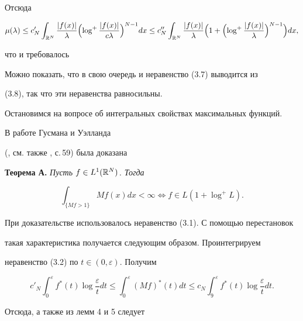 Отсюда 


$$ 


\mu(\lambda)\le c'_N \int_{\Bbb R^N}\frac{|f(x)|}{\lambda} 


\Bigl(\log^+\frac{|f(x)|}{c\lambda}\Bigr)^{N-1}dx \le


c''_N \int_{\Bbb R^N}\frac{|f(x)|}{\lambda}


\Bigl(1+\Bigl(\log^+\frac{|f(x)|}{\lambda}\Bigr)^{N-1}\Bigr)dx,


$$ 


что и требовалось 


 


Можно показать, что в свою очередь и неравенство (3.7) выводится из


(3.8), так что эти неравенства равносильны. 


 


Остановимся на вопросе об интегральных свойствах максимальных функций. 


В работе Гусмана и Уэлланда 


(\cite{Guz3}, см. также \cite{Guz2}, с.\,59) была доказана 


\medskip 


 


{\bf Теорема А.} {\it Пусть $f\in L^1(\Bbb R^N)$. Тогда} 


$$ 


\int_{\{Mf>1\}}Mf(x)dx<\infty \Longleftrightarrow 


f\in L(1+\log^+L). 


$$ 


\medskip 


При доказательстве использовалось неравенство (3.1). С помощью перестановок 


такая характеристика получается следующим образом. Проинтегрируем 


неравенство (3.2) по $t\in(0,\varepsilon)$. Получим 


$$ 


c'_N\int_0^\varepsilon f^*(t)\log\frac{\varepsilon}{t}dt \le 


\int_0^\varepsilon (Mf)^*(t)dt \le 


c_N\int_9^\varepsilon f^*(t)\log\frac{\varepsilon}{t}dt. 


$$ 


Отсюда, а также из лемм 4 и 5 следует 


\medskip 


